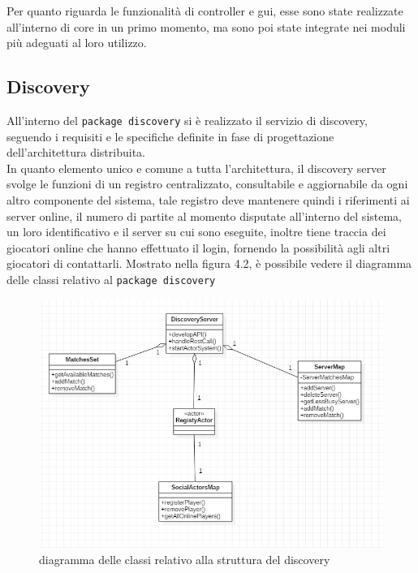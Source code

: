   Per quanto riguarda le funzionalità di controller e gui, esse sono state realizzate all'interno di core in un primo momento, ma sono poi state integrate nei moduli più adeguati al loro utilizzo.

\subsection {Discovery}\label{subsec:details:discovery}
All'interno del \texttt{package discovery} si è realizzato il servizio di discovery, seguendo i requisiti e le specifiche definite in fase di progettazione dell'architettura distribuita.\\
In quanto elemento unico e comune a tutta l'architettura, il discovery server svolge le funzioni di un registro centralizzato, consultabile e aggiornabile da ogni altro componente del sistema, tale registro deve mantenere quindi i riferimenti ai server online, il numero di partite al momento disputate all'interno del sistema, un loro identificativo e il server su cui sono eseguite, inoltre tiene traccia dei giocatori online che hanno effettuato il login, fornendo la possibilità agli altri giocatori di contattarli.
Mostrato nella figura 4.2, è possibile vedere il diagramma delle classi relativo al \texttt{package discovery}

 \begin{figure}[htbp]
  \includegraphics[width=\textwidth,height=\textheight,keepaspectratio]{discoveryArchitecture}
   \caption{diagramma delle classi relativo alla struttura del discovery}
  \end{figure}

